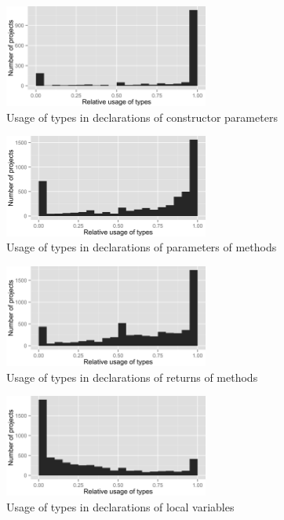 \begin{figure}[h]
\centering 
\includegraphics[width=0.6\textwidth]{../aosd_2014/analysis/result/all/histograms/9_Constructor_Parameter.png} 
\caption{Usage of types in declarations of constructor parameters}
\end{figure}

\begin{figure}[h]
\centering 
\includegraphics[width=0.6\textwidth]{../aosd_2014/analysis/result/all/histograms/8_Method_Parameter.png} 
\caption{Usage of types in declarations of parameters of methods}
\end{figure}

\begin{figure}[h]
\centering 
\includegraphics[width=0.6\textwidth]{../aosd_2014/analysis/result/all/histograms/7_Method_Return.png} 
\caption{Usage of types in declarations of returns of methods}
\end{figure}

\begin{figure}[h]
\centering 
\includegraphics[width=0.6\textwidth]{../aosd_2014/analysis/result/all/histograms/6_Local_Variable.png} 
\caption{Usage of types in declarations of local variables}
\end{figure}

